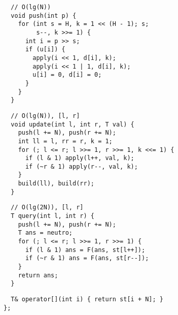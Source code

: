 \documentclass[twoside]{article}
\newcommand{\fileTitleStyle}{\large\underline}
\begin{document}
\begin{multicols*}{2}
\begin{verbatim}
  // O(lg(N))
  void push(int p) {
    for (int s = H, k = 1 << (H - 1); s;
         s--, k >>= 1) {
      int i = p >> s;
      if (u[i]) {
        apply(i << 1, d[i], k);
        apply(i << 1 | 1, d[i], k);
        u[i] = 0, d[i] = 0;
      }
    }
  }
\end{verbatim}
\vspace{-12pt}
\begin{verbatim}
  // O(lg(N)), [l, r]
  void update(int l, int r, T val) {
    push(l += N), push(r += N);
    int ll = l, rr = r, k = 1;
    for (; l <= r; l >>= 1, r >>= 1, k <<= 1) {
      if (l & 1) apply(l++, val, k);
      if (~r & 1) apply(r--, val, k);
    }
    build(ll), build(rr);
  }
\end{verbatim}
\vspace{-12pt}
\begin{verbatim}
  // O(lg(2N)), [l, r]
  T query(int l, int r) {
    push(l += N), push(r += N);
    T ans = neutro;
    for (; l <= r; l >>= 1, r >>= 1) {
      if (l & 1) ans = F(ans, st[l++]);
      if (~r & 1) ans = F(ans, st[r--]);
    }
    return ans;
  }
\end{verbatim}
\vspace{-12pt}
\begin{verbatim}
  T& operator[](int i) { return st[i + N]; }
};
\end{verbatim}

\subsubsectionfont{\centering\bfseries\Large}
\subsubsectionfont{\fileTitleStyle}

\end{multicols*}
\end{document}
